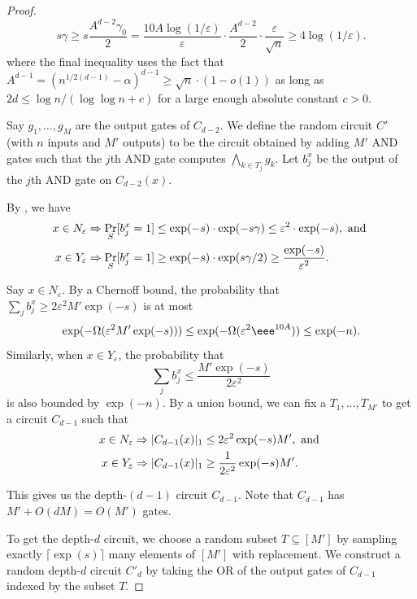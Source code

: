 \documentclass{toc}
\newcommand{\prob}[2]{\mathop{\mathrm{Pr}}_{#1}[#2]}
\begin{document}
\begin{proof}
\[
s\gamma \geq s\frac{A^{d-2}\gamma_0}{2}= \frac{10A\log(1/\varepsilon)}{\varepsilon}\cdot \frac{A^{d-2}}{2}\cdot \frac{\varepsilon}{\sqrt{n}}\geq 4\log(1/\varepsilon).
\]
where the final inequality uses the fact that $A^{d-1}= (n^{1/2(d-1)}-\alpha)^{d-1} \geq \sqrt{n}\cdot(1-o(1))$ as long as $2d\leq \log n/(\log \log n + c)$ for a large enough absolute constant $c > 0$.

Say $g_1,\ldots,g_M$ are the output gates of $C_{d-2}$. We define the random circuit $C'$ (with $n$ inputs and $M'$ outputs) to be the circuit obtained by adding $M'$ AND gates such that the $j$th AND gate computes $\bigwedge_{k\in T_j}g_k$. Let $b_j^x$ be the output of the $j$th AND gate on $C_{d-2}(x)$.

By , we have
\begin{align}
x\in N_\varepsilon &\Rightarrow \prob{S}{b_j^x = 1} \leq \exp(-s)\cdot \exp(-s\gamma)\leq \varepsilon^2\cdot\exp(-s), \text{ and } \notag \\
x\in Y_\varepsilon &\Rightarrow \prob{S}{b_j^x = 1} \geq \exp(-s)\cdot\exp(s\gamma/2)\geq \frac{\exp(-s)}{\varepsilon^2}. \label{eq:Ctop.1}
\end{align}

Say $x\in N_\varepsilon$. By a Chernoff bound, the probability that $\sum_{j}b_j^x \geq 2\varepsilon^2 M'\exp(-s)$ is at most
\[
  \exp(-\Omega(\varepsilon^2 M'\exp(-s))) \leq \exp(-\Omega(\varepsilon^2 \eee^{10A}))\leq \exp(-n).
\]
Similarly, when $x\in Y_\varepsilon$, the probability that
\[
  \sum_{j}b_j^x \leq\frac{M'\exp(-s)}{2\varepsilon^2}
\]
is also bounded by $\exp(-n)$. By a union bound, we can fix a
$T_1,\ldots,T_{M'}$ to get a circuit $C_{d-1}$ such that
\begin{align}
x\in N_\varepsilon &\Rightarrow |C_{d-1}(x)|_1 \leq 2\varepsilon^2 \exp(-s)M', \text{ and } \notag \\
x\in Y_\varepsilon &\Rightarrow |C_{d-1}(x)|_1 \geq \frac{1}{2\varepsilon^2} \exp(-s)M'. \label{eq:Ctop.2}
\end{align}

This gives us the depth-$(d-1)$ circuit $C_{d-1}$. Note that $C_{d-1}$ has $M' + O(dM) = O(M')$ gates.

To get the depth-$d$ circuit, we choose a random subset $T\subseteq [M']$ by sampling exactly $\lceil\exp(s)\rceil$  many elements of $[M']$ with replacement. We construct a random depth-$d$ circuit $C'_d$ by taking the OR of the output gates of $C_{d-1}$ indexed by the subset $T$. 


\end{proof}
\end{document}
